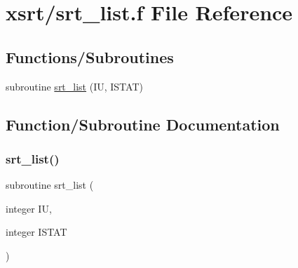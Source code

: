 \hypertarget{srt__list_8f}{}\section{xsrt/srt\+\_\+list.f File Reference}
\label{srt__list_8f}
\subsection*{Functions/\+Subroutines}
\begin{DoxyCompactItemize}
\item 
subroutine \hyperlink{srt__list_8f_aa39dd1bc56862a8e45205b60e167ebfe}{srt\+\_\+list} (IU, I\+S\+T\+AT)
\end{DoxyCompactItemize}


\subsection{Function/\+Subroutine Documentation}
\mbox{\label{srt__list_8f_aa39dd1bc56862a8e45205b60e167ebfe}} 
\subsubsection{\texorpdfstring{srt\+\_\+list()}{srt\_list()}}
{\footnotesize\ttfamily subroutine srt\+\_\+list (\begin{DoxyParamCaption}\item[{integer}]{IU,  }\item[{integer}]{I\+S\+T\+AT }\end{DoxyParamCaption})}


